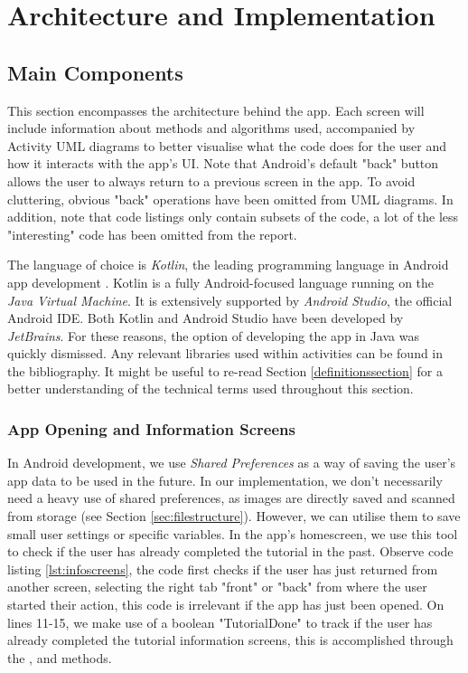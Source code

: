 \chapter{Architecture and Implementation}
\section{Main Components}
This section encompasses the architecture behind the app. Each screen will include information about methods and algorithms used, accompanied by Activity UML diagrams to better visualise what the code does for the user and how it interacts with the app's UI. Note that Android's default "back" button allows the user to always return to a previous screen in the app. To avoid cluttering, obvious "back" operations have been omitted from UML diagrams. In addition, note that code listings only contain subsets of the code, a lot of the less "interesting" code has been omitted from the report.

The language of choice is \emph{Kotlin}, the leading programming language in Android app development \cite{sagar_2019}.  Kotlin is a fully Android-focused language running on the \emph{Java Virtual Machine}. It is extensively supported by \emph{Android Studio}, the official Android IDE. Both Kotlin and Android Studio have been developed by \emph{JetBrains}. For these reasons, the option of developing the app in Java was quickly dismissed. Any relevant libraries used within activities can be found in the bibliography. It might be useful to re-read Section \ref{definitionssection} for a better understanding of the technical terms used throughout this section.

\subsection{App Opening and Information Screens}

In Android development, we use \emph{Shared Preferences} as a way of saving the user's app data to be used in the future. In our implementation, we don't necessarily need a heavy use of shared preferences, as images are directly saved and scanned from storage (see Section \ref{sec:filestructure}). However, we can utilise them to save small user settings or specific variables. In the app's homescreen, we use this tool to check if the user has already completed the tutorial in the past. Observe code listing \ref{lst:infoscreens}, the code first checks if the user has just returned from another screen, selecting the right tab "front" or "back" from where the user started their action, this code is irrelevant if the app has just been opened. On lines 11-15, we make use of a boolean "TutorialDone" to track if the user has already completed the tutorial information screens, this is accomplished through the ,  and  methods.


